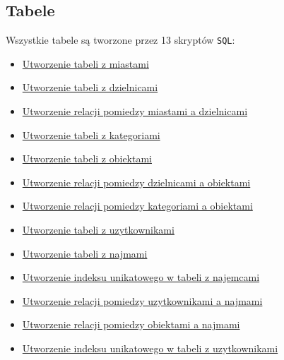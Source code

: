 \subsection{Tabele}

Wszystkie tabele są tworzone przez 13 skryptów \texttt{SQL}:
\begin{itemize}
	\item \href{run:Sources/SQL/1. Tabele/001_Utworzenie_tabeli_z_miastami.sql}{Utworzenie tabeli z miastami}
	\item \href{run:Sources/SQL/1. Tabele/002_Utworzenie_tabeli_z_dzielnicami.sql}{Utworzenie tabeli z dzielnicami}
	\item \href{run:Sources/SQL/1. Tabele/003_Utworzenie_relacji_pomiedzy_miastami_a_dzielnicami.sql}{Utworzenie relacji pomiedzy miastami a dzielnicami}
	\item \href{run:Sources/SQL/1. Tabele/004_Utworzenie_tabeli_z_kategoriami.sql}{Utworzenie tabeli z kategoriami}
	\item \href{run:Sources/SQL/1. Tabele/005_Utworzenie_tabeli_z_obiektami.sql}{Utworzenie tabeli z obiektami}
	\item \href{run:Sources/SQL/1. Tabele/006_Utworzenie_relacji_pomiedzy_dzielnicami_a_obiektami.sql}{Utworzenie relacji pomiedzy dzielnicami a obiektami}
	\item \href{run:Sources/SQL/1. Tabele/007_Utworzenie_relacji_pomiedzy_kategoriami_a_obiektami.sql}{Utworzenie relacji pomiedzy kategoriami a obiektami}
	\item \href{run:Sources/SQL/1. Tabele/008_Utworzenie_tabeli_z_uzytkownikami.sql}{Utworzenie tabeli z uzytkownikami}
	\item \href{run:Sources/SQL/1. Tabele/009_Utworzenie_tabeli_z_najmami.sql}{Utworzenie tabeli z najmami}
	\item \href{run:Sources/SQL/1. Tabele/010_Utworzenie_indeksu_unikatowego_w_tabeli_z_najemcami.sql}{Utworzenie indeksu unikatowego w tabeli z najemcami}
	\item \href{run:Sources/SQL/1. Tabele/011_Utworzenie_relacji_pomiedzy_uzytkownikami_a_najmami.sql}{Utworzenie relacji pomiedzy uzytkownikami a najmami}
	\item \href{run:Sources/SQL/1. Tabele/012_Utworzenie_relacji_pomiedzy_obiektami_a_najmami.sql}{Utworzenie relacji pomiedzy obiektami a najmami}
	\item \href{run:Sources/SQL/1. Tabele/013_Utworzenie_indeksu_unikatowego_w_tabeli_z_uzytkownikami.sql}{Utworzenie indeksu unikatowego w tabeli z uzytkownikami}
\end{itemize}

